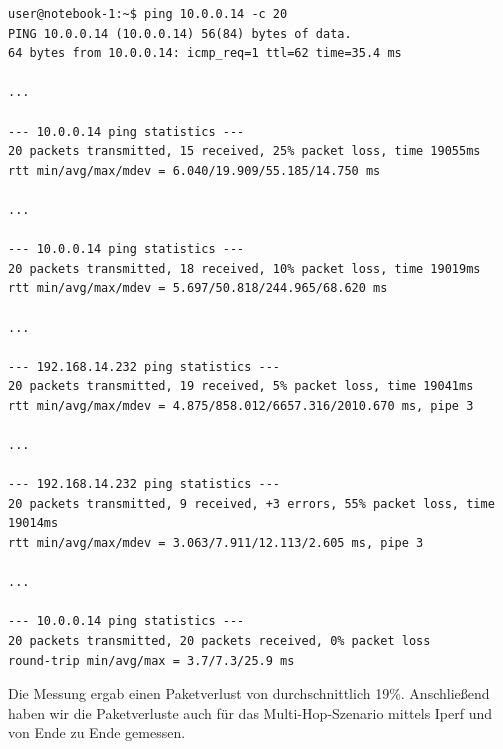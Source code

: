 \documentclass[a4paper,10pt]{article}
\begin{document}
\begin{lstlisting}
user@notebook-1:~$ ping 10.0.0.14 -c 20
PING 10.0.0.14 (10.0.0.14) 56(84) bytes of data.
64 bytes from 10.0.0.14: icmp_req=1 ttl=62 time=35.4 ms

...

--- 10.0.0.14 ping statistics --- 
20 packets transmitted, 15 received, 25% packet loss, time 19055ms
rtt min/avg/max/mdev = 6.040/19.909/55.185/14.750 ms

...

--- 10.0.0.14 ping statistics ---
20 packets transmitted, 18 received, 10% packet loss, time 19019ms
rtt min/avg/max/mdev = 5.697/50.818/244.965/68.620 ms

...

--- 192.168.14.232 ping statistics ---
20 packets transmitted, 19 received, 5% packet loss, time 19041ms
rtt min/avg/max/mdev = 4.875/858.012/6657.316/2010.670 ms, pipe 3

...

--- 192.168.14.232 ping statistics ---
20 packets transmitted, 9 received, +3 errors, 55% packet loss, time 19014ms
rtt min/avg/max/mdev = 3.063/7.911/12.113/2.605 ms, pipe 3

...

--- 10.0.0.14 ping statistics ---
20 packets transmitted, 20 packets received, 0% packet loss
round-trip min/avg/max = 3.7/7.3/25.9 ms
\end{lstlisting}

Die Messung ergab einen Paketverlust von durchschnittlich 19\%.
Anschließend haben wir die Paketverluste auch für das Multi-Hop-Szenario mittels Iperf und von Ende zu Ende gemessen.
 
\end{document}
